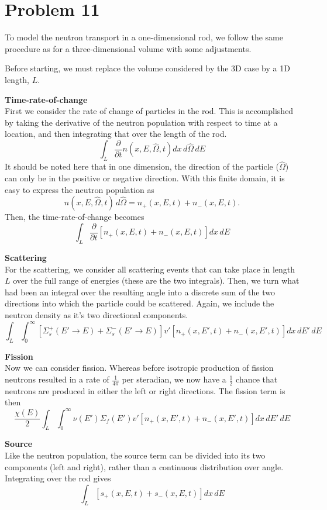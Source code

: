 \documentclass{article}
\newcommand{\Oh}{\hat{\Omega}}
\begin{document}

\section*{Problem 11}

To model the neutron transport in a one-dimensional rod, we follow the same procedure as for a three-dimensional volume with some adjustments.

Before starting, we must replace the volume considered by the 3D case by a 1D length, $L$. 

\textbf{Time-rate-of-change}\\
First we consider the rate of change of particles in the rod. This is accomplished by taking the derivative of the neutron population with respect to time at a location, and then integrating that over the length of the rod.
$$ \int_L \frac{\partial}{\partial t}n(x,E,\Oh,t)dx\,d\Oh\,dE $$
It should be noted here that in one dimension, the direction of the particle ($\Oh$) can only be in the positive or negative direction. With this finite domain, it is easy to express the neutron population as
$$ n(x,E,\Oh,t)\,d\Oh = n_{+}(x,E,t) + n_{-}(x,E,t). $$
Then, the time-rate-of-change becomes
$$ \int_L \frac{\partial}{\partial t}\left[n_{+}(x,E,t) + n_{-}(x,E,t)\right]dx\,dE $$

\textbf{Scattering}\\
For the scattering, we consider all scattering events that can take place in length $L$ over the full range of energies (these are the two integrals). Then, we turn what had been an integral over the resulting angle into a discrete sum of the two directions into which the particle could be scattered. Again, we include the neutron density as it's two directional components.
$$ \int_L \int_0^{\infty} \left[\Sigma_s^{+}(E'\rightarrow E) + \Sigma_s^{-}(E'\rightarrow E)\right] v' \left[n_{+}(x,E',t) + n_{-}(x,E',t)\right]dx\,dE'\,dE$$

\textbf{Fission}\\
Now we can consider fission. Whereas before isotropic production of fission neutrons resulted in a rate of $\frac{1}{4\pi}$ per steradian, we now have a $\frac{1}{2}$ chance that neutrons are produced in either the left or right directions. The fission term is then
$$ \frac{\chi(E)}{2} \int_L \int_0^{\infty} \nu(E') \Sigma_f(E') v' \left[n_{+}(x,E',t) + n_{-}(x,E',t)\right]dx\,dE'\,dE $$

\textbf{Source}\\
Like the neutron population, the source term can be divided into its two components (left and right), rather than a continuous distribution over angle. Integrating over the rod gives
$$ \int_L \left[s_{+}(x,E,t) + s_{-}(x,E,t)\right]dx\,dE $$
\end{document}
